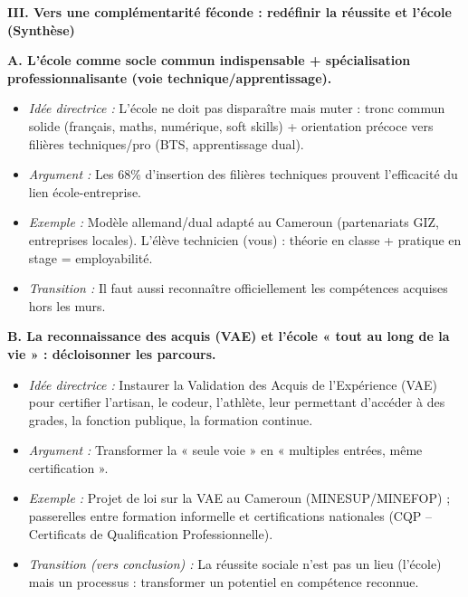 \documentclass[11pt]{article}
\begin{document}
\begin{exoresolu}
\noindent\textbf{III. Vers une complémentarité féconde : redéfinir la réussite et l'école (Synthèse)}

\noindent\textbf{A. L'école comme socle commun indispensable + spécialisation professionnalisante (voie technique/apprentissage).}
\begin{itemize}
    \item \textit{Idée directrice :} L'école ne doit pas disparaître mais muter : tronc commun solide (français, maths, numérique, soft skills) + orientation précoce vers filières techniques/pro (BTS, apprentissage dual).
    \item \textit{Argument :} Les 68\% d'insertion des filières techniques prouvent l'efficacité du lien école-entreprise.
    \item \textit{Exemple :} Modèle allemand/dual adapté au Cameroun (partenariats GIZ, entreprises locales). L'élève technicien (vous) : théorie en classe + pratique en stage = employabilité.
    \item \textit{Transition :} Il faut aussi reconnaître officiellement les compétences acquises hors les murs.
\end{itemize}

\noindent\textbf{B. La reconnaissance des acquis (VAE) et l'école « tout au long de la vie » : décloisonner les parcours.}
\begin{itemize}
    \item \textit{Idée directrice :} Instaurer la Validation des Acquis de l'Expérience (VAE) pour certifier l'artisan, le codeur, l'athlète, leur permettant d'accéder à des grades, la fonction publique, la formation continue.
    \item \textit{Argument :} Transformer la « seule voie » en « multiples entrées, même certification ».
    \item \textit{Exemple :} Projet de loi sur la VAE au Cameroun (MINESUP/MINEFOP) ; passerelles entre formation informelle et certifications nationales (CQP -- Certificats de Qualification Professionnelle).
    \item \textit{Transition (vers conclusion) :} La réussite sociale n'est pas un lieu (l'école) mais un processus : transformer un potentiel en compétence reconnue.
\end{itemize}


\end{exoresolu}
\end{document}
